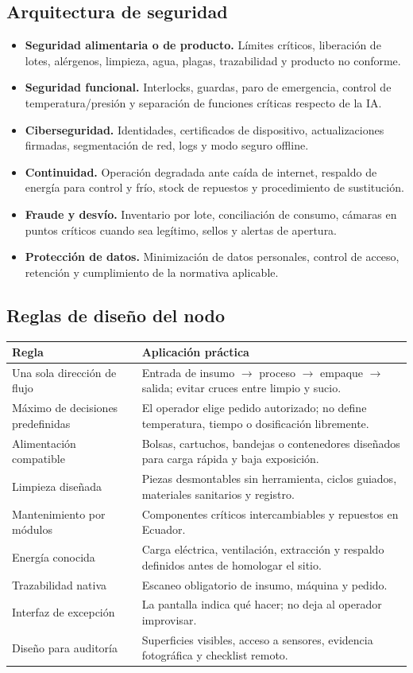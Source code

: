 \documentclass[11pt,a4paper]{article}
\begin{document}
\subsection{Arquitectura de seguridad}
\begin{itemize}
\item \textbf{Seguridad alimentaria o de producto.} Límites críticos, liberación de lotes, alérgenos,
limpieza, agua, plagas, trazabilidad y producto no conforme.
\item \textbf{Seguridad funcional.} Interlocks, guardas, paro de emergencia, control de
temperatura/presión y separación de funciones críticas respecto de la IA.
\item \textbf{Ciberseguridad.} Identidades, certificados de dispositivo, actualizaciones firmadas,
segmentación de red, logs y modo seguro offline.
\item \textbf{Continuidad.} Operación degradada ante caída de internet, respaldo de energía para control y
frío, stock de repuestos y procedimiento de sustitución.
\item \textbf{Fraude y desvío.} Inventario por lote, conciliación de consumo, cámaras en puntos críticos
cuando sea legítimo, sellos y alertas de apertura.
\item \textbf{Protección de datos.} Minimización de datos personales, control de acceso, retención y
cumplimiento de la normativa aplicable.
\end{itemize}

\subsection{Reglas de diseño del nodo}
{\small
\begin{xltabular}{\textwidth}{@{}P{4.2cm}L@{}}
\toprule
\textbf{Regla} & \textbf{Aplicación práctica}\\ \midrule
Una sola dirección de flujo & Entrada de insumo $\rightarrow$ proceso $\rightarrow$ empaque $\rightarrow$ salida; evitar cruces entre limpio y sucio.\\
Máximo de decisiones predefinidas & El operador elige pedido autorizado; no define temperatura, tiempo o dosificación libremente.\\
Alimentación compatible & Bolsas, cartuchos, bandejas o contenedores diseñados para carga rápida y baja exposición.\\
Limpieza diseñada & Piezas desmontables sin herramienta, ciclos guiados, materiales sanitarios y registro.\\
Mantenimiento por módulos & Componentes críticos intercambiables y repuestos en Ecuador.\\
Energía conocida & Carga eléctrica, ventilación, extracción y respaldo definidos antes de homologar el sitio.\\
Trazabilidad nativa & Escaneo obligatorio de insumo, máquina y pedido.\\
Interfaz de excepción & La pantalla indica qué hacer; no deja al operador improvisar.\\
Diseño para auditoría & Superficies visibles, acceso a sensores, evidencia fotográfica y checklist remoto.\\
\bottomrule
\end{xltabular}}
\end{document}

